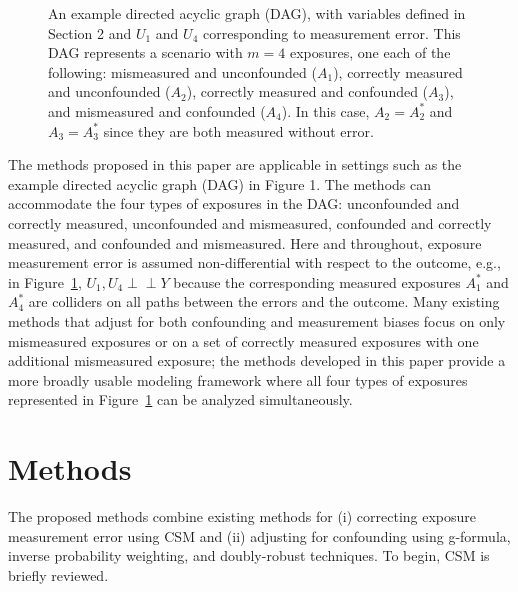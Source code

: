 \documentclass[useAMS,usenatbib,referee]{biom}
\begin{document}
\begin{figure}
\centering
{}
\caption{An example directed acyclic graph (DAG), with variables defined in Section 2 and $U_{1}$ and $U_{4}$ corresponding to measurement error. This DAG represents a scenario with $m=4$ exposures, one each of the following: mismeasured and unconfounded ($A_{1}$), correctly measured and unconfounded ($A_{2}$), correctly measured and confounded ($A_{3}$), and mismeasured and confounded ($A_{4}$). In this case, $A_{2} = A^{*}_{2}$ and $A_{3} = A^{*}_{3}$ since they are both measured without error.}
\label{fig:one}
\end{figure}

The methods proposed in this paper are applicable in settings such as the example directed acyclic graph (DAG) in Figure 1. The methods can accommodate the four types of exposures in the DAG: unconfounded and correctly measured, unconfounded and mismeasured, confounded and correctly measured, and confounded and mismeasured. Here and throughout, exposure measurement error is assumed non-differential with respect to the outcome, e.g., in Figure~\ref{fig:one}, $U_{1}, U_{4} \perp \!\!\! \perp Y$ because the corresponding measured exposures $A^{*}_{1}$ and $A^{*}_{4}$ are colliders on all paths between the errors and the outcome. Many existing methods that adjust for both confounding and measurement biases focus on only mismeasured exposures or on a set of correctly measured exposures with one additional mismeasured exposure; the methods developed in this paper provide a more broadly usable modeling framework where all four types of exposures represented in Figure~\ref{fig:one} can be analyzed simultaneously.

\section{Methods}
\label{s:methods}

The proposed methods combine existing methods for (i) correcting exposure measurement error using CSM and (ii) adjusting for confounding using g-formula, inverse probability weighting, and doubly-robust techniques. To begin, CSM is briefly reviewed.
\end{document}
